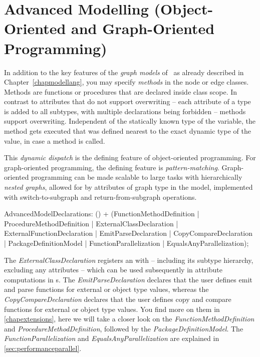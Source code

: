 \chapter{Advanced Modelling (Object-Oriented and Graph-Oriented Programming)}
\label{cha:modeladvanced}

In addition to the key features of the \emph{graph models} of \GrG\ as already described in Chapter~\ref{chapmodellang}, you may specify \emph{methods} in the node or edge classes.
Methods are functions or procedures that are declared inside class scope.
In contrast to attributes that do not support overwriting -- each attribute of a type is added to all subtypes, with multiple declarations being forbidden -- methods support overwriting.
Independent of the statically known type of the variable, the method gets executed that was defined nearest to the exact dynamic type of the value, in case a method is called.

This \emph{dynamic dispatch} is the defining feature of object-oriented programming.
For graph-oriented programming, the defining feature is \emph{pattern-matching}.
Graph-oriented programming can be made scalable to large tasks with hierarchically \emph{nested graphs}, allowed for by attributes of graph type in the model, implemented with switch-to-subgraph and return-from-subgraph operations.

\begin{rail}
  AdvancedModelDeclarations: () + (FunctionMethodDefinition
										 | ProcedureMethodDefinition
  									 | ExternalClassDeclaration
  									 | ExternalFunctionDeclaration
  									 | EmitParseDeclaration
  									 | CopyCompareDeclaration
										 | PackageDefinitionModel
										 | FunctionParallelization
										 | EqualsAnyParallelization);
\end{rail}

The \emph{ExternalClassDeclaration} registers an  with \GrG -- including its subtype hierarchy, excluding any attributes -- which can be used subsequently in attribute computations in s.
The \emph{EmitParseDeclaration} declares that the user defines emit and parse functions for external or object type values,
whereas the \emph{CopyCompareDeclaration} declares that the user defines copy and compare functions for external or object type values.
You find more on them in \ref{chapextensions}, here we will take a closer look on the \emph{FunctionMethodDefinition} and \emph{ProcedureMethodDefinition}, followed by the \emph{PackageDefinitionModel}.
The \emph{FunctionParallelization} and \emph{EqualsAnyParallelization} are explained in \ref{sec:performanceparallel}.

